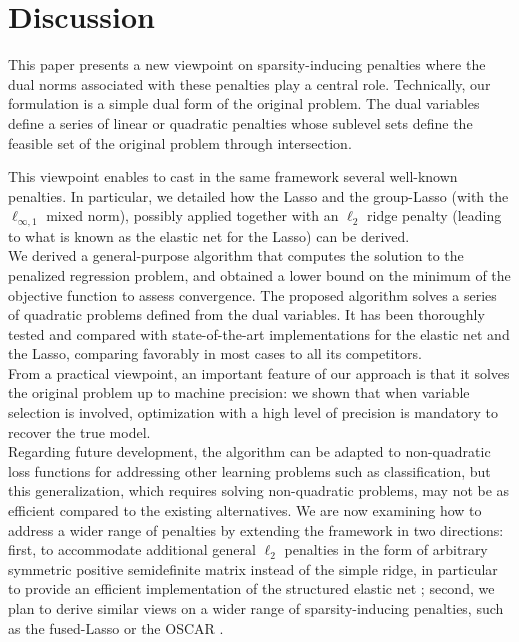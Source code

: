 \section{Discussion}


This paper presents a new viewpoint on sparsity-inducing penalties
where the dual norms associated with these penalties play a central role. 
Technically, our formulation is a simple dual form of the original problem.
The dual variables define a series of linear or quadratic penalties whose 
sublevel sets define the feasible set of the original problem through
intersection.

This  viewpoint  enables  to  cast   in  the  same  framework  several
well-known penalties. In particular, we detailed how the Lasso and the
group-Lasso (with the $\ell_{\infty,1}$  mixed norm), possibly applied
together with an  $\ell_2$ ridge penalty (leading to what  is known as
the elastic net for the Lasso) can be derived. 
\\

We derived a  general-purpose algorithm that computes  the solution to
the penalized regression problem,  and obtained a lower
bound  on the  minimum  of  the objective  function  to
assess convergence.  The proposed  algorithm solves a series of
quadratic  problems defined  from  the dual  variables.   It has  been
thoroughly tested  and compared with  state-of-the-art implementations
for the elastic  net and the Lasso, comparing favorably  in most cases
to all its competitors.%
\\

From a  practical viewpoint, an  important feature of our  approach is
that it solves the original problem  up to machine precision: we shown
that when  variable selection  is involved,  optimization with  a high
level of precision is mandatory to recover the true model.
\\

Regarding  future  development,  the   algorithm  can  be  adapted  to
non-quadratic loss  functions for  addressing other  learning problems
such  as  classification,  but  this  generalization,  which  requires
solving non-quadratic  problems, may not  be as efficient  compared to
the  existing alternatives.   We are  now examining  how to  address a
wider range of penalties by extending the framework in two directions:
first,  to accommodate  additional general  $\ell_2$ penalties  in the
form of  arbitrary symmetric  positive semidefinite matrix  instead of
the simple ridge, in particular to provide an efficient implementation
of the  structured elastic  net \citep{2010_AOS_Slawski} ;  second, we
plan to  derive similar  views on a  wider range  of sparsity-inducing
penalties, such as the fused-Lasso or the OSCAR \citep{Bondell08}.
